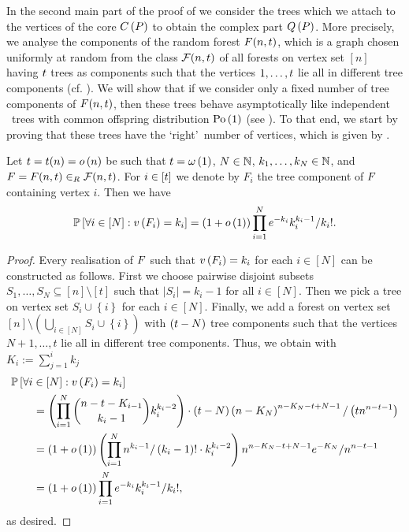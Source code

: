 In the second main part of the proof of  we consider the trees which we attach to the vertices of the core $C\left(P\right)$ to obtain the complex part $Q\left(P\right)$. More precisely, we analyse the components of the random forest $F(n,t)$, which is a graph chosen uniformly at random from the class $\mathcal{F}(n,t)$ of all forests on vertex set $[n]$ having $t$ trees as components such that the vertices $1, \ldots, t$ lie all in different tree components (cf. ). We will show that if we consider only a fixed number of tree components of $F(n,t)$, then these trees behave asymptotically like independent \GW\ trees with common offspring distribution $\operatorname{Po}\left(1\right)$ (see ). To that end, we start by proving that these trees have the \lq right\rq\ number of vertices, which is given by .
\begin{lem}\label{LSlem:number_vertices_gwt}
Let $t=t(n)=o\left(n\right)$ be such that $t=\omega\left(1\right)$, $N\in\mathbb{N}$, $k_1, \ldots, k_N\in\mathbb{N}$, and $F=F(n,t)\in_R\mathcal{F}(n,t)$. For $i\in[t]$ we denote by $F_i$ the tree component of $F$ containing vertex $i$. Then we have
\begin{align*}
\mathbb{P}\left[\forall i\in[N]:v\left({F_i}\right)=k_i \right]=\left(1+o\left(1\right)\right)\prod_{i=1}^{N}e^{-k_i}k_i^{k_i-1}/k_i!.
\end{align*}
\end{lem}
\begin{proof}
Every realisation of $F$ such that $v\left({F_i}\right)=k_i$ for each $i\in[N]$ can be constructed as follows. First we choose pairwise disjoint subsets $S_1, \ldots, S_N\subseteq [n]\setminus[t]$ such that $\left|S_i\right|=k_i-1$ for all $i\in[N]$. Then we pick a tree on vertex set $S_i\cup \left\{i\right\}$ for each $i\in[N]$. Finally, we add a forest on vertex set $[n]\setminus\left(\bigcup_{i\in[N]}S_i\cup\left\{i\right\}\right)$ with $(t-N)$ tree components such that the vertices $N+1, \ldots, t$ lie all in different tree components. Thus, we obtain with $K_i:=\sum_{j=1}^{i}k_j$
\begin{align*}
&\mathbb{P}\left[\forall i\in[N]:v\left({F_i}\right)=k_i\right]
\\
&~~~~~~=\left(\prod_{i=1}^{N}\binom{n-t-K_{i-1}}{k_i-1}k_i^{k_i-2}\right)\cdot (t-N)\left(n-K_N\right)^{n-K_N-t+N-1}/\left(t n^{n-t-1}\right)
\\
&~~~~~~=\left(1+o\left(1\right)\right)\left(\prod_{i=1}^{N}n^{k_i-1}/\left(k_i-1\right)!\cdot  k_i^{k_i-2}\right)n^{n-K_N-t+N-1}e^{-K_N}/n^{n-t-1}
\\
&~~~~~~=\left(1+o\left(1\right)\right)\prod_{i=1}^{N}e^{-k_i}k_i^{k_i-1}/k_i!,
\end{align*}
as desired.
\end{proof}
